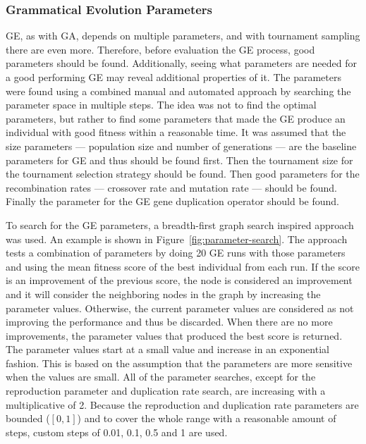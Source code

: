 
\subsubsection{Grammatical Evolution Parameters}
\gls{GE}, as with \gls{GA}, depends on multiple parameters, and with tournament sampling there are even more.
Therefore, before evaluation the \gls{GE} process, good parameters should be found.
Additionally, seeing what parameters are needed for a good performing \gls{GE} may reveal additional properties of it.
The parameters were found using a combined manual and automated approach by searching the parameter space in multiple steps.
The idea was not to find the optimal parameters, but rather to find some parameters that made the \gls{GE} produce an individual with good fitness within a reasonable time.
It was assumed that the size parameters --- population size and number of generations --- are the baseline parameters for \gls{GE} and thus should be found first.
Then the tournament size for the tournament selection strategy should be found.
Then good parameters for the recombination rates --- crossover rate and mutation rate --- should be found.
Finally the parameter for the \gls{GE} gene duplication operator should be found.

To search for the \gls{GE} parameters, a breadth-first graph search inspired approach was used.
An example is shown in Figure~\ref{fig:parameter-search}.
The approach tests a combination of parameters by doing 20 \gls{GE} runs with those parameters and using the mean fitness score of the best individual from each run.
If the score is an improvement of the previous score, the node is considered an improvement and it will consider the neighboring nodes in the graph by increasing the parameter values.
Otherwise, the current parameter values are considered as not improving the performance and thus be discarded.
When there are no more improvements, the parameter values that produced the best score is returned.
The parameter values start at a small value and increase in an exponential fashion.
This is based on the assumption that the parameters are more sensitive when the values are small.
All of the parameter searches, except for the reproduction parameter and duplication rate search, are increasing with a multiplicative of 2.
Because the reproduction and duplication rate parameters are bounded ($[0, 1]$) and to cover the whole range with a reasonable amount of steps, custom steps of 0.01, 0.1, 0.5 and 1 are used.

